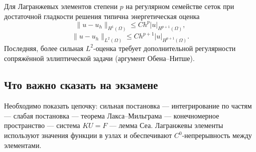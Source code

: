 Для Лагранжевых элементов степени $p$ на регулярном семействе сеток при
достаточной гладкости решения типична энергетическая оценка
\[
    \|u-u_h\|_{H^1(\Omega)}\leq C h^p|u|_{H^{p+1}(\Omega)},
\]
\[
    \|u-u_h\|_{L^2(\Omega)}\leq C h^{p+1}|u|_{H^{p+1}(\Omega)}.
\]
Последняя, более сильная $L^2$-оценка требует дополнительной регулярности
сопряжённой эллиптической задачи (аргумент Обена--Нитше).

\subsection{Что важно сказать на экзамене}

Необходимо показать цепочку: сильная постановка --- интегрирование по частям ---
слабая постановка --- теорема Лакса--Мильграма --- конечномерное пространство ---
система $KU=F$ --- лемма Сеа.
Лагранжевы элементы используют значения функции в узлах и обеспечивают
$C^0$-непрерывность между элементами.

\newpage